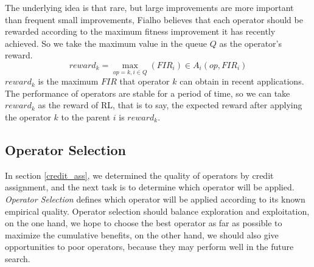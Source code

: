 \documentclass[journal]{IEEEtran}
\begin{document}
The underlying idea is that rare, but large improvements are more important than frequent small improvements, Fialho \cite{fialho2010comparison} believes that each operator should be rewarded according to the maximum fitness improvement it has recently achieved.
So we take the maximum value in the queue $Q$ as the operator's reward.
\begin{equation}
  reward_k = \max_{op=k, i\in Q}(FIR_i) \in A_i(op,FIR_i)
\end{equation}
$reward_k$ is the maximum $FIR$ that operator $k$ can obtain in recent applications.
The performance of operators are stable for a period of time, so we can take $reward_k$ as the reward of RL, that is to say, the expected reward after applying the operator $k$ to the parent $i$ is $reward_k$.


\subsection{Operator Selection}
In section \ref{credit_ass}, we determined the quality of operators by credit assignment, and the next task is to determine which operator will be applied. \textit{Operator Selection} defines which operator will be applied according to its known empirical quality.
Operator selection should balance exploration and exploitation, on the one hand, we hope to choose the best operator as far as possible to maximize the cumulative benefits, on the other hand, we should also give opportunities to poor operators, because they may perform well in the future search.
\end{document}
